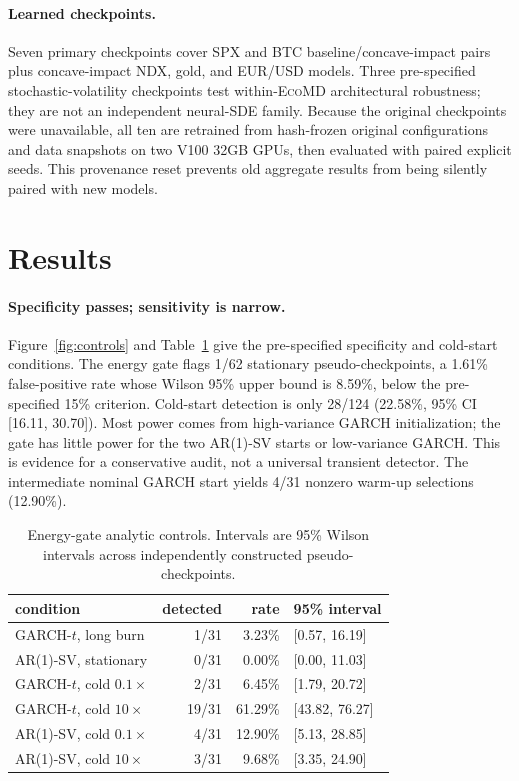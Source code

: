 \documentclass{article}
\newcommand{\method}{\textsc{EcoMD}}
\begin{document}
\paragraph{Learned checkpoints.}
Seven primary checkpoints cover SPX and BTC baseline/concave-impact pairs plus concave-impact NDX,
gold, and EUR/USD models. Three pre-specified stochastic-volatility checkpoints test within-\method{}
architectural robustness; they are not an independent neural-SDE family. Because the original
checkpoints were unavailable, all ten are retrained from hash-frozen original configurations and data
snapshots on two V100 32GB GPUs, then evaluated with paired explicit seeds. This provenance reset
prevents old aggregate results from being silently paired with new models.

\section{Results}

\paragraph{Specificity passes; sensitivity is narrow.}
Figure~\ref{fig:controls} and Table~\ref{tab:controls} give the pre-specified specificity and cold-start
conditions. The energy gate flags 1/62 stationary pseudo-checkpoints, a 1.61\% false-positive rate
whose Wilson 95\% upper bound is 8.59\%, below the pre-specified 15\% criterion. Cold-start detection is only
28/124 (22.58\%, 95\% CI [16.11, 30.70]). Most power comes from high-variance GARCH initialization;
the gate has little power for the two AR(1)-SV starts or low-variance GARCH. This is evidence for a
conservative audit, not a universal transient detector. The intermediate nominal GARCH start yields
4/31 nonzero warm-up selections (12.90\%).

\begin{table}[t]
\centering
\small
\caption{Energy-gate analytic controls. Intervals are 95\% Wilson intervals across independently
constructed pseudo-checkpoints.}
\label{tab:controls}
\begin{tabular}{lrrl}
\toprule
condition & detected & rate & 95\% interval \\
\midrule
GARCH-$t$, long burn & 1/31 & 3.23\% & [0.57, 16.19] \\
AR(1)-SV, stationary & 0/31 & 0.00\% & [0.00, 11.03] \\
GARCH-$t$, cold $0.1\times$ & 2/31 & 6.45\% & [1.79, 20.72] \\
GARCH-$t$, cold $10\times$ & 19/31 & 61.29\% & [43.82, 76.27] \\
AR(1)-SV, cold $0.1\times$ & 4/31 & 12.90\% & [5.13, 28.85] \\
AR(1)-SV, cold $10\times$ & 3/31 & 9.68\% & [3.35, 24.90] \\
\bottomrule
\end{tabular}
\end{table}
\end{document}
